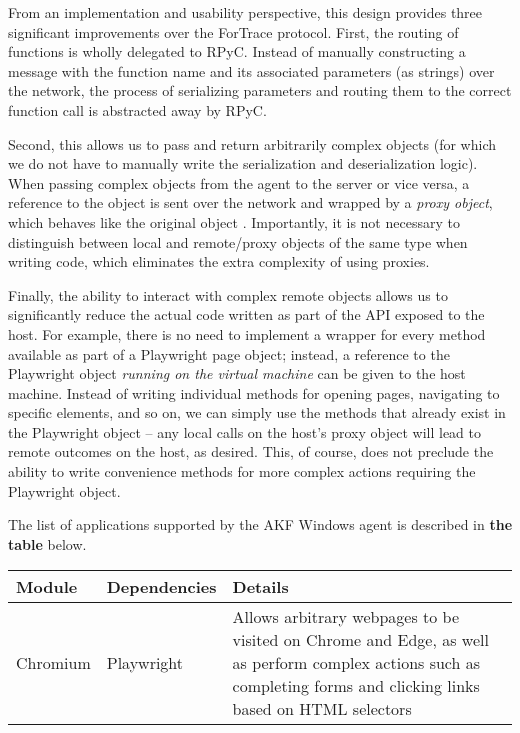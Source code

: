 \documentclass[letterpaper,12pt]{report}
\begin{document}
From an implementation and usability perspective, this design provides
three significant improvements over the ForTrace protocol. First, the
routing of functions is wholly delegated to RPyC. Instead of manually
constructing a message with the function name and its associated
parameters (as strings) over the network, the process of serializing
parameters and routing them to the correct function call is abstracted
away by RPyC.

Second, this allows us to pass and return arbitrarily complex objects
(for which we do not have to manually write the serialization and
deserialization logic). When passing complex objects from the agent to
the server or vice versa, a reference to the object is sent over the
network and wrapped by a \emph{proxy object}, which behaves like the
original object \cite{TheoryOperationRPyC}. Importantly, it is not
necessary to distinguish between local and remote/proxy objects of the
same type when writing code, which eliminates the extra complexity of
using proxies.

Finally, the ability to interact with complex remote objects allows us
to significantly reduce the actual code written as part of the API
exposed to the host. For example, there is no need to implement a
wrapper for every method available as part of a Playwright page object;
instead, a reference to the Playwright object \emph{running on the
virtual machine} can be given to the host machine. Instead of writing
individual methods for opening pages, navigating to specific elements,
and so on, we can simply use the methods that already exist in the
Playwright object -- any local calls on the host's proxy object will
lead to remote outcomes on the host, as desired. This, of course, does
not preclude the ability to write convenience methods for more complex
actions requiring the Playwright object.

The list of applications supported by the AKF Windows agent is described
in \textbf{the table} below.

\begin{longtable}[]{@{}
  >{\raggedright\arraybackslash}p{}
  >{\raggedright\arraybackslash}p{}
  >{\raggedright\arraybackslash}p{}@{}}
\toprule\noalign{}
\begin{minipage}[b]{\linewidth}\raggedright
Module
\end{minipage} & \begin{minipage}[b]{\linewidth}\raggedright
Dependencies
\end{minipage} & \begin{minipage}[b]{\linewidth}\raggedright
Details
\end{minipage} \\
\midrule\noalign{}
\endhead
\bottomrule\noalign{}
\endlastfoot
Chromium & Playwright \cite{MicrosoftPlaywrightpython2025} & Allows
arbitrary webpages to be visited on Chrome and Edge, as well as perform
complex actions such as completing forms and clicking links based on
HTML selectors \\
\end{longtable}
\end{document}
